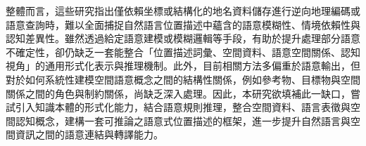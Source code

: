 整體而言，這些研究指出僅依賴坐標或結構化的地名資料儲存進行逆向地理編碼或語意查詢時，難以全面捕捉自然語言位置描述中蘊含的語意模糊性、情境依賴性與認知差異性。雖然透過給定語意建模或模糊邏輯等手段，有助於提升處理部分語意不確定性，卻仍缺乏一套能整合「位置描述詞彙、空間資料、語意空間關係、認知視角」的通用形式化表示與推理機制。此外，目前相關方法多偏重於語意輸出，但對於如何系統性建模空間語意概念之間的結構性關係，例如參考物、目標物與空間關係之間的角色與制約關係，尚缺乏深入處理。因此，本研究欲填補此一缺口，嘗試引入知識本體的形式化能力，結合語意規則推理，整合空間資料、語言表徵與空間認知概念，建構一套可推論之語意式位置描述的框架，進一步提升自然語言與空間資訊之間的語意連結與轉譯能力。

